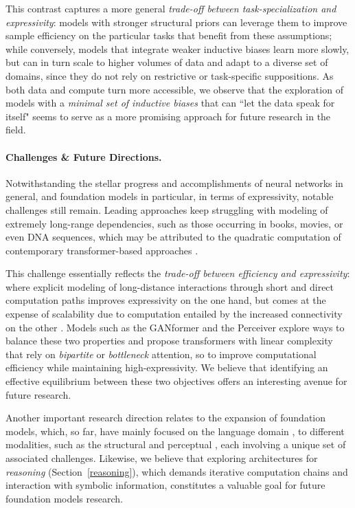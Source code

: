 This contrast captures a more general \textit{trade-off between task-specialization and expressivity}: models with stronger structural priors can leverage them to improve sample efficiency on the particular tasks that benefit from these assumptions; while conversely, models that integrate weaker inductive biases learn more slowly, but can in turn scale to higher volumes of data and adapt to a diverse set of domains, since they do not rely on restrictive or task-specific suppositions. As both data and compute turn more accessible, we observe that the exploration of models with a \textit{minimal set of inductive biases} that can ``let the data speak for itself" seems to serve as a more promising approach for future research in the field.

\paragraph{Challenges \& Future Directions.} Notwithstanding the stellar progress and accomplishments of neural networks in general, and foundation models in particular, in terms of expressivity, notable challenges still remain. Leading approaches \citep{performer,visual_transformer} keep struggling with modeling of extremely long-range dependencies, such as those occurring in books, movies, or even DNA sequences, which may be attributed to the quadratic computation of contemporary transformer-based approaches \citep{wang2020linformer,lin-et-al-2021-naacl}. 

This challenge essentially reflects the \textit{trade-off between efficiency and expressivity}: where explicit modeling of long-distance interactions through short and direct computation paths improves expressivity on the one hand, but comes at the expense of scalability due to computation entailed by the increased connectivity on the other \citep{child2019generating,kitaev2020reformer,performer}. Models such as the GANformer \citep{ganformer} and the Perceiver \citep{jaegle2021perceiver,jaegle2021perceiverio} explore ways to balance these two properties and propose transformers with linear complexity that rely on \textit{bipartite} or \textit{bottleneck} attention, so to improve computational efficiency while maintaining high-expressivity. We believe that identifying an effective equilibrium between these two objectives offers an interesting avenue for future research.

Another important research direction relates to the expansion of foundation models, which, so far, have mainly focused on the language domain \citep{peters2018elmo,devlin2019bert,brown2020gpt3}, to different modalities, such as the structural \citep{gnn,gat} and perceptual \citep{tolstikhin2021mlpmixer,jaegle2021perceiver,dosovitskiy2021ima}, each involving a unique set of associated challenges. Likewise, we believe that exploring architectures for \textit{reasoning} (Section~\ref{reasoning}), which demands iterative computation chains and interaction with symbolic information, constitutes a valuable goal for future foundation models research.

